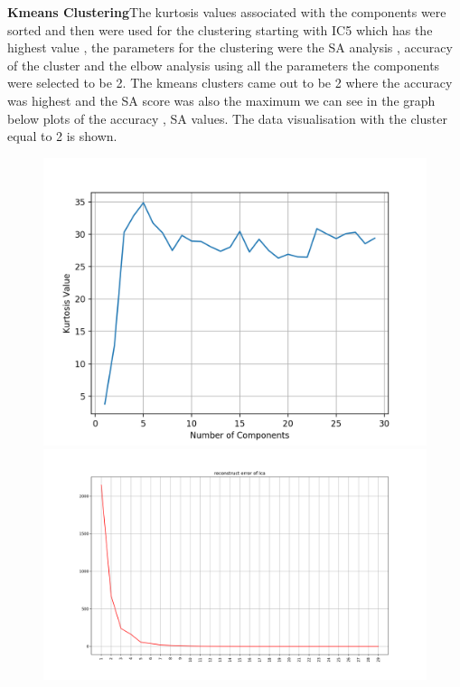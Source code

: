 \documentclass[a4paper,12pt]{article}
\begin{document}
\textbf{Kmeans Clustering}The kurtosis values associated with the components were sorted and then were used for the clustering starting with IC5 which has the highest value , the parameters for the clustering were the SA analysis , accuracy of the cluster and the elbow analysis using all the parameters the components were selected to be 2. The kmeans clusters came out to be 2 where the accuracy was highest and the SA score was also the maximum we can see in the graph below  plots of the accuracy , SA values. The data visualisation with the cluster equal to 2 is shown.
\begin{figure}[!htb]
   \begin{minipage}{0.33\textwidth}
     \centering
     \includegraphics[width=.95\linewidth]{ica_dataset1}
   \end{minipage}\hfill
    \begin{minipage}{0.33\textwidth}
     \centering
     \includegraphics[width=.95\linewidth]{recons_ica_dataset1}

\end{minipage}
\end{figure}
\end{document}

